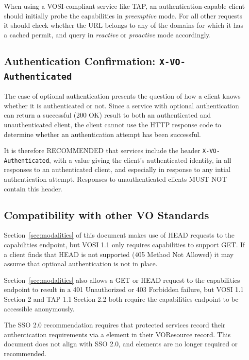 \documentclass[11pt,a4paper]{ivoa}
\newcommand{\header}[1]{{\tt #1}}
\begin{document}
When using a VOSI-compliant service like TAP,
an authentication-capable client should initially probe
the capabilities in {\em preemptive\/} mode.
For all other requests it should check whether the URL
belongs to any of the domains for which it has a cached permit,
and query in {\em reactive\/} or {\em proactive\/} mode accordingly.


\subsection{Authentication Confirmation: {\tt X-VO-Authenticated}}

The case of optional authentication presents the question
of how a client knows whether it is authenticated or not.
Since a service with optional authentication can return
a successful (200 OK) result to both an authenticated and unauthenticated
client,
the client cannot use the HTTP response code to determine whether
an authentication attempt has been successful.

It is therefore RECOMMENDED that services include the header
\header{X-VO-Authenticated}, with a value giving the client's
authenticated identity, in all responses to an authenticated client,
and especially in response to any intial authentication attempt.
Responses to unauthenticated clients MUST NOT contain this header.



\subsection{Compatibility with other VO Standards}

Section~\ref{sec:modalities} of this document
makes use of HEAD requests to the capabilities endpoint,
but VOSI 1.1 \citep{2017ivoa.spec.0524G}
only requires capabilities to support GET.
If a client finds that HEAD is not supported (405 Method Not Allowed)
it may assume that optional authentication is not in place.

Section~\ref{sec:modalities} also allows a GET or HEAD request
to the capabilities endpoint to result in a
401 Unauthorized or 403 Forbidden failure,
but VOSI 1.1 Section 2 and TAP 1.1 Section 2.2 both require
the capabilities endpoint to be accessible anonymously.

The SSO 2.0 recommendation \citep{2017ivoa.spec.0524T}
requires that protected services
record their authentication requirements via a
 element in their VOResource record.
This document does not align with SSO 2.0,
and  elements are no longer required or recommended.
\end{document}

